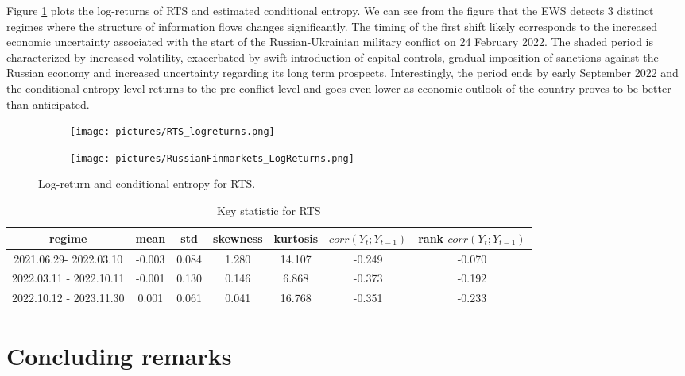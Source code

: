 Figure \ref{fig:entropy_RUS} plots the log-returns of RTS and estimated conditional entropy. We can see from the figure that the EWS detects 3 distinct  regimes where the structure of information flows changes significantly. The timing of the first shift likely corresponds to the increased economic uncertainty associated with the start of the Russian-Ukrainian military conflict on 24 February 2022. The shaded period is characterized by increased volatility, exacerbated by swift introduction of capital controls, gradual imposition of sanctions against the Russian economy and increased uncertainty regarding its long term prospects. Interestingly, the period ends by early September 2022 and the conditional entropy level returns to the pre-conflict level and goes even lower as economic outlook of the country proves to be better than anticipated. 
\begin{figure}[H]
     \begin{subfigure}[b]{\textwidth}
         \centering
     \texttt{[image: pictures/RTS\_logreturns.png]}
     \end{subfigure}
     \vfill
     \begin{subfigure}[b]{\textwidth}
         \centering
 \texttt{[image: pictures/RussianFinmarkets\_LogReturns.png]}    
     \end{subfigure}
     \caption{Log-return and conditional entropy for RTS.}\label{fig:entropy_RUS}
\end{figure}

\begin{table}[H]
    \centering
    \begin{tabular}{c|cccccc}        regime& mean& std&  skewness&  kurtosis&  $corr(Y_t; Y_{t-1})$& rank $corr(Y_t; Y_{t-1})$\\ \hline 
         2021.06.29- 2022.03.10& -0.003& 0.084& 1.280&  14.107&  -0.249& -0.070\\         2022.03.11 - 2022.10.11& -0.001& 0.130&  0.146&  6.868&  -0.373& -0.192\\         2022.10.12 - 2023.11.30& 0.001& 0.061& 0.041&  16.768&  -0.351& -0.233\\\hline
    \end{tabular}
    \caption{Key statistic for RTS}\label{tab:regimes_RUS}
\end{table}


\section{Concluding remarks}\label{sec:concl}

